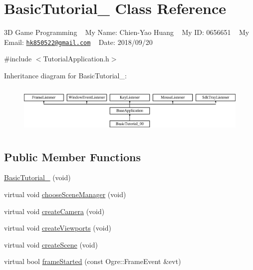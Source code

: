 \hypertarget{class_basic_tutorial__00}{}\section{Basic\+Tutorial\+\_ Class Reference}
\label{class_basic_tutorial__00}


3D Game Programming ~\newline
My Name\+: Chien-\/\+Yao Huang ~\newline
My ID\+: 0656651 ~\newline
My Email\+: \href{mailto:hk850522@gmail.com}{\tt hk850522@gmail.\+com} ~\newline
 Date\+: 2018/09/20  




{\ttfamily \#include $<$Tutorial\+Application.\+h$>$}

Inheritance diagram for Basic\+Tutorial\+\_\+:\begin{figure}[H]
\begin{center}
\leavevmode
\includegraphics[height=2.382979cm]{class_basic_tutorial__00}
\end{center}
\end{figure}
\subsection*{Public Member Functions}
\begin{DoxyCompactItemize}
\item 
\mbox{\hyperlink{class_basic_tutorial__00_a6b55068822076b28e7819b1878e95684}{Basic\+Tutorial\+\_}} (void)
\item 
virtual void \mbox{\hyperlink{class_basic_tutorial__00_aba97a29d983586d2dc8e108d3bccf721}{choose\+Scene\+Manager}} (void)
\item 
virtual void \mbox{\hyperlink{class_basic_tutorial__00_a1bf709417d654dffc2ea10987412b912}{create\+Camera}} (void)
\item 
virtual void \mbox{\hyperlink{class_basic_tutorial__00_adc2454d9f8226e0958ecf702f355846e}{create\+Viewports}} (void)
\item 
virtual void \mbox{\hyperlink{class_basic_tutorial__00_a15a3d4673724ec99077ce992f996a550}{create\+Scene}} (void)
\item 
virtual bool \mbox{\hyperlink{class_basic_tutorial__00_a94e281a96584a25bf57b1c5e73737c81}{frame\+Started}} (const Ogre\+::\+Frame\+Event \&evt)
\end{DoxyCompactItemize}
